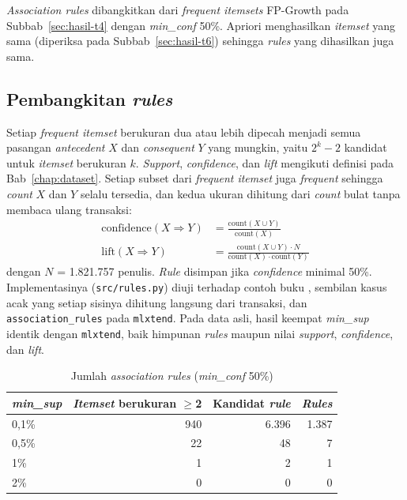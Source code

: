 \textit{Association rules} dibangkitkan dari \textit{frequent itemsets} FP-Growth pada Subbab~\ref{sec:hasil-t4} dengan \textit{min\_conf} 50\%. Apriori menghasilkan \textit{itemset} yang sama (diperiksa pada Subbab~\ref{sec:hasil-t6}) sehingga \textit{rules} yang dihasilkan juga sama.

\subsection{Pembangkitan \textit{rules}}
\label{sec:hasil-t5-bangkit}
Setiap \textit{frequent itemset} berukuran dua atau lebih dipecah menjadi semua pasangan \textit{antecedent} $X$ dan \textit{consequent} $Y$ yang mungkin, yaitu $2^k - 2$ kandidat untuk \textit{itemset} berukuran $k$. \textit{Support}, \textit{confidence}, dan \textit{lift} mengikuti definisi pada Bab~\ref{chap:dataset}. Setiap subset dari \textit{frequent itemset} juga \textit{frequent} sehingga \textit{count} $X$ dan $Y$ selalu tersedia, dan kedua ukuran dihitung dari \textit{count} bulat tanpa membaca ulang transaksi:
\begin{align}
\mathrm{confidence}(X \Rightarrow Y) &= \frac{\mathrm{count}(X \cup Y)}{\mathrm{count}(X)} \\
\mathrm{lift}(X \Rightarrow Y) &= \frac{\mathrm{count}(X \cup Y) \cdot N}{\mathrm{count}(X) \cdot \mathrm{count}(Y)}
\end{align}
dengan $N$ = 1.821.757 penulis. \textit{Rule} disimpan jika \textit{confidence} minimal 50\%. Implementasinya (\texttt{src/rules.py}) diuji terhadap contoh buku \textcite{han2012}, sembilan kasus acak yang setiap sisinya dihitung langsung dari transaksi, dan \texttt{association\_rules} pada \texttt{mlxtend}. Pada data asli, hasil keempat \textit{min\_sup} identik dengan \texttt{mlxtend}, baik himpunan \textit{rules} maupun nilai \textit{support}, \textit{confidence}, dan \textit{lift}.

\begin{table}[ht]
\caption{Jumlah \textit{association rules} (\textit{min\_conf} 50\%)}
\label{tab:t5-jumlah}
\small
\begin{tabular}{@{}lrrr@{}}
\toprule
\textbf{\textit{min\_sup}} & \textbf{\textit{Itemset} berukuran $\geq$2} & \textbf{Kandidat \textit{rule}} & \textbf{\textit{Rules}} \\
\midrule
0,1\% & 940 & 6.396 & 1.387 \\
0,5\% & 22 & 48 & 7 \\
1\% & 1 & 2 & 1 \\
2\% & 0 & 0 & 0 \\
\bottomrule
\end{tabular}
\end{table}

